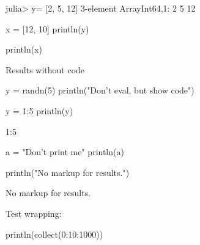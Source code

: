 

\begin{juliaterm}
julia> y= [2, 5, 12]
3-element Array{Int64,1}:
  2
  5
 12
\end{juliaterm}



\begin{juliacode}
x = [12, 10]
println(y)

\end{juliacode}
\begin{juliaout}
[2,5,12]
\end{juliaout}

\begin{juliacode}
println(x)
\end{juliacode}
\begin{juliaout}
[12,10]
\end{juliaout}




\begin{juliaout}
Results without code
\end{juliaout}

\begin{juliaout}
[12,10]
\end{juliaout}




\begin{juliacode}
y = randn(5)
println("Don't eval, but show code")
\end{juliacode}



\begin{juliacode}
y = 1:5
println(y)
\end{juliacode}
\begin{juliaout}
1:5
\end{juliaout}



\begin{juliacode}
a = "Don't print me"
println(a)
\end{juliacode}



\begin{juliacode}
println("No markup for results.")
\end{juliacode}
No markup for results.




Test wrapping:

\begin{juliacode}
println(collect(0:10:1000))
\end{juliacode}
\begin{juliaout}
[0,10,20,30,40,50,60,70,80,90,100,110,120,130,140,150,160,170,180,190,200,2
10,220,230,240,250,260,270,280,290,300,310,320,330,340,350,360,370,380,390,
400,410,420,430,440,450,460,470,480,490,500,510,520,530,540,550,560,570,580
,590,600,610,620,630,640,650,660,670,680,690,700,710,720,730,740,750,760,77
0,780,790,800,810,820,830,840,850,860,870,880,890,900,910,920,930,940,950,9
60,970,980,990,1000]
\end{juliaout}



